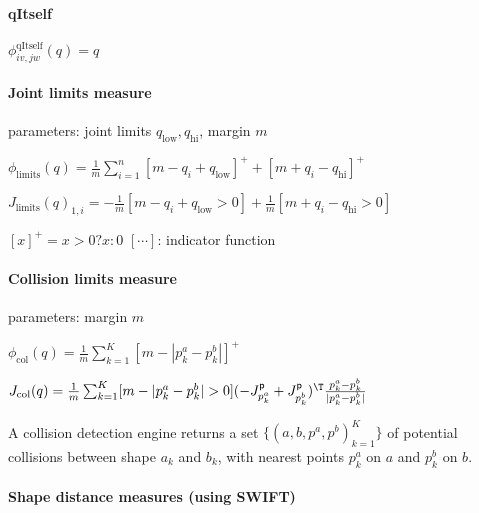 \documentclass[10pt,fleqn,twoside]{article}
\newcommand{\pos}{{\textsf{p}}}
\begin{document}
{{\paragraph{qItself}

$\phi^\text{qItself}_{iv,jw}(q) = q$


\paragraph{Joint limits measure}

parameters: joint limits $q_{\text{low}}, q_{\text{hi}}$, margin $m$

$\phi_{\text{limits}}(q) = \frac{1}{m}\sum_{i=1}^n [m-q_i+q_{\text{low}}]^+ + [m+q_i-q_{\text{hi}}]^+$

$J_{\text{limits}}(q)_{1,i} = - \frac{1}{m}[m-q_i+q_{\text{low}}>0] + \frac{1}{m}[m+q_i-q_{\text{hi}}>0]$

$[x]^+ = x>0\text{?}x:0$ \qquad $[\cdots]$: indicator function


\paragraph{Collision limits measure}

parameters: margin $m$

$\phi_{\text{col}}(q) = \frac{1}{m}\sum_{k=1}^K [m-|p^a_k - p^b_k|]^+$

$J_{\text{col}}(q) = \frac{1}{m} \sum_{k=1}^K [m-|p^a_k - p^b_k|>0]
(- J^\pos_{p^a_k} + J^\pos_{p^b_k})^\T \frac{p^a_k - p^b_k}{|p^a_k - p^b_k|}$ 

A collision detection engine returns a set $\{
(a,b,p^a,p^b)_{k=1}^K \}$ of potential collisions between shape $a_k$
and $b_k$, with nearest points $p^a_k$ on $a$ and $p^b_k$ on $b$.


\paragraph{Shape distance measures (using SWIFT)}

}}
\end{document}
